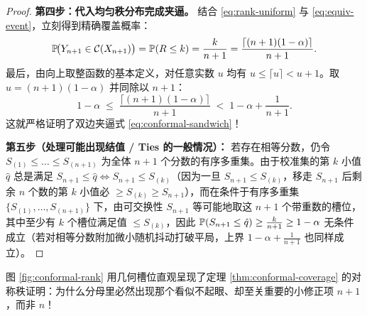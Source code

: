 \begin{proof}
\textbf{第四步：代入均匀秩分布完成夹逼。}
结合 \eqref{eq:rank-uniform} 与 \eqref{eq:equiv-event}，立刻得到精确覆盖概率：
\[
  \mathbb{P}\!\big(Y_{n+1} \in \mathcal{C}(X_{n+1})\big)
  = \mathbb{P}(R \le k)
  = \frac{k}{n+1}
  = \frac{\lceil (n+1)(1-\alpha) \rceil}{n+1}.
\]
最后，由向上取整函数的基本定义，对任意实数 $u$ 均有 $u \le \lceil u \rceil < u + 1$。取 $u = (n+1)(1-\alpha)$ 并同除以 $n+1$：
\[
  1 - \alpha \;\le\; \frac{\lceil (n+1)(1-\alpha) \rceil}{n+1} \;<\; 1 - \alpha + \frac{1}{n+1}.
\]
这就严格证明了双边夹逼式 \eqref{eq:conformal-sandwich}！

\textbf{第五步（处理可能出现结值 / Ties 的一般情况）：}
若存在相等分数，仍令 $S_{(1)} \le \dots \le S_{(n+1)}$ 为全体 $n+1$ 个分数的有序多重集。由于校准集的第 $k$ 小值 $\hat{q}$ 总是满足 $S_{n+1} \le \hat{q} \iff S_{n+1} \le S_{(k)}$（因为一旦 $S_{n+1} \le S_{(k)}$，移走 $S_{n+1}$ 后剩余 $n$ 个数的第 $k$ 小值必 $\ge S_{(k)} \ge S_{n+1}$），而在条件于有序多重集 $\{S_{(1)},\dots,S_{(n+1)}\}$ 下，由可交换性 $S_{n+1}$ 等可能地取这 $n+1$ 个带重数的槽位，其中至少有 $k$ 个槽位满足值 $\le S_{(k)}$，因此 $\mathbb{P}(S_{n+1} \le \hat{q}) \ge \frac{k}{n+1} \ge 1-\alpha$ 无条件成立（若对相等分数附加微小随机抖动打破平局，上界 $1-\alpha+\frac{1}{n+1}$ 也同样成立）。
\end{proof}

图 \ref{fig:conformal-rank} 用几何槽位直观呈现了定理 \ref{thm:conformal-coverage} 的对称秩证明：为什么分母里必然出现那个看似不起眼、却至关重要的小修正项 $n+1$，而非 $n$！

